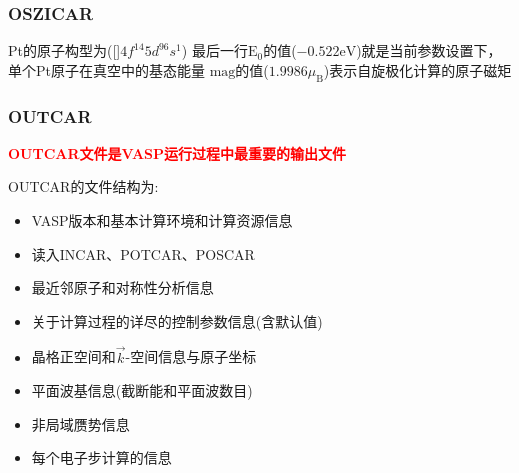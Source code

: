 \frame
{
	\frametitle{\textrm{OSZICAR}}
\textrm{Pt}的原子构型为([]$4\mathit{f}^{14}5\mathit{d}^96\mathit{s}^1$)
\vskip 5pt
最后一行$\mathrm{E}_0$的值($-0.522\mathrm{eV}$)就是当前参数设置下，单个\textrm{Pt}原子在真空中的基态能量
{\fontsize{8.5pt}{5.2pt}}	
$\mathrm{mag}$的值($1.9986\mu_{\mathrm{B}}$)表示自旋极化计算的原子磁矩%
{\fontsize{8.5pt}{5.2pt}}
}
\frame
{
	\frametitle{\textrm{OUTCAR}}
	\textcolor{red}{
\textbf{OUTCAR文件是\textrm{VASP}运行过程中最重要的输出文件}%
}

{\fontsize{7.5pt}{5.2pt}\selectfont{文件不仅包括输入文件的既有信息，还有计算体系的对称性分析，$\vec k$空间布点和具体位置，平面波基信息和最近邻原子的距离等基本信息;~此外记录了每一步离子弛豫和电子弛豫的计算信息}}%

\textrm{OUTCAR}的文件结构为:~
\begin{itemize}
	\item \textrm{VASP}版本和基本计算环境和计算资源信息
	\item 读入\textrm{INCAR}、\textrm{POTCAR}、\textrm{POSCAR}
	\item 最近邻原子和对称性分析信息
	\item 关于计算过程的详尽的控制参数信息(含默认值)
	\item 晶格正空间和$\vec k$-空间信息与原子坐标
	\item 平面波基信息(截断能和平面波数目)
	\item 非局域赝势信息
	\item 每个电子步计算的信息
	\end{itemize}
}

